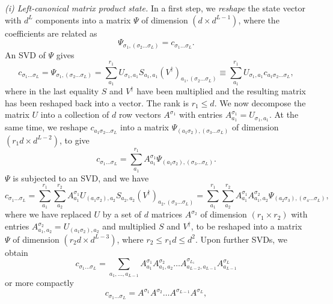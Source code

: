 \documentclass[a4paper,10pt,oneside,onecolumn,1p,times]{elsarticle}
\begin{document}
{\em (i) Left-canonical matrix product state.} In a first step, we {\em reshape} the state vector with $d^L$ components into a matrix $\Psi$ of dimension $(d \times d^{L-1})$, where the coefficients are related as 
\begin{equation}
\Psi_{\sigma_1, (\sigma_2 \ldots \sigma_L)} = c_{\sigma_1 \ldots \sigma_L}  .
\end{equation}
An SVD of $\Psi$ gives
\begin{equation}
c_{\sigma_1 \ldots \sigma_L}  = \Psi_{\sigma_1, (\sigma_2 \ldots \sigma_L)} = \sum_{a_1}^{r_1} U_{\sigma_1,a_1} S_{a_1,a_1} (V^\dagger)_{a_1, (\sigma_2 \ldots \sigma_L)} \equiv \sum_{a_1}^{r_1}  U_{\sigma_1,a_1} c_{a_1\sigma_2\ldots\sigma_L} ,
\end{equation}
where in the last equality $S$ and $V^\dagger$ have been multiplied and the resulting matrix has been reshaped back into a vector. The rank is $r_1 \leq d$. We now decompose the matrix $U$ into a collection of $d$ row vectors $A^{\sigma_1}$ with entries $A^{\sigma_1}_{a_1}=U_{\sigma_1,a_1}$. At the same time, we reshape $c_{a_1\sigma_2\ldots\sigma_L}$ into a matrix $\Psi_{(a_1\sigma_2),(\sigma_3 \ldots \sigma_L)}$ of dimension $(r_1 d \times d^{L-2})$, to give
\begin{equation}
c_{\sigma_1 \ldots \sigma_L}  = \sum_{a_1}^{r_1} A^{\sigma_1}_{a_1} \Psi_{(a_1\sigma_2), (\sigma_3 \ldots \sigma_L)} .
\end{equation}
$\Psi$ is subjected to an SVD, and we have 
\begin{equation}
c_{\sigma_1 \ldots \sigma_L}  = \sum_{a_1}^{r_1} \sum_{a_2}^{r_2} A^{\sigma_1}_{a_1} U_{(a_1\sigma_2),a_2} S_{a_2,a_2} (V^\dagger)_{a_2, (\sigma_3 \ldots \sigma_L)} =  
\sum_{a_1}^{r_1} \sum_{a_2}^{r_2} A^{\sigma_1}_{a_1} A^{\sigma_2}_{a_1,a_2} \Psi_{(a_2\sigma_3), (\sigma_4 \ldots \sigma_L)} ,
\end{equation}
where we have replaced $U$ by a set of $d$ matrices $A^{\sigma_2}$ of dimension $(r_1 \times r_2)$ with entries $A^{\sigma_2}_{a_1,a_2} = U_{(a_1\sigma_2),a_2}$ and multiplied $S$ and $V^\dagger$, to be reshaped into a matrix $\Psi$ of dimension $(r_2 d \times d ^{L-3})$, where $r_2 \leq r_1 d \leq d^2$. Upon further SVDs, we obtain
\begin{equation}
c_{\sigma_1 \ldots \sigma_L} = \sum_{a_1, \ldots, a_{L-1}} A^{\sigma_1}_{a_1} A^{\sigma_2}_{a_1,a_2} \ldots A^{\sigma_{L_1}}_{a_{L-2},a_{L-1}} A^{\sigma_{L}}_{a_{L-1}}
\end{equation}
or more compactly
\begin{equation}
c_{\sigma_1 \ldots \sigma_L} = A^{\sigma_1} A^{\sigma_2} \ldots A^{\sigma_{L-1}} A^{\sigma_L} ,
\end{equation}
\end{document}
